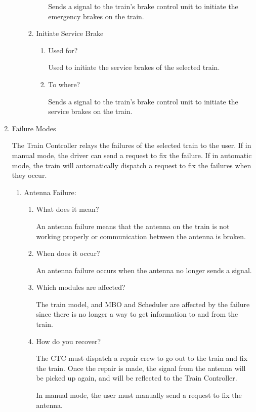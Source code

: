 \documentclass[11pt]{article}
\begin{document}
\begin{enumerate}
\begin{enumerate}
\begin{enumerate}
\begin{enumerate}
Sends a signal to the train's brake control unit to initiate the emergency brakes on the train.
\end{enumerate}
\item Initiate Service Brake
\label{sec-3-1-5-8-2-3}
\begin{enumerate}
\item Used for?
\label{sec-3-1-5-8-2-3-1}

Used to initiate the service brakes of the selected train.
\item To where?
\label{sec-3-1-5-8-2-3-2}

Sends a signal to the train's brake control unit to initiate the service brakes on the train.
\end{enumerate}
\end{enumerate}
\end{enumerate}
\item Failure Modes
\label{sec-3-1-5-9}

The Train Controller relays the failures of the selected train to the user. If in manual mode, the driver can send a request to fix the failure. If in automatic mode, the train will automatically dispatch a request to fix the failures when they occur. 
\begin{enumerate}
\item Antenna Failure:
\label{sec-3-1-5-9-1}
\begin{enumerate}
\item What does it mean?
\label{sec-3-1-5-9-1-1}

An antenna failure means that the antenna on the train is not working properly or communication between the antenna is broken.  
\item When does it occur?
\label{sec-3-1-5-9-1-2}

An antenna failure occurs when the antenna no longer sends a signal.
\item Which modules are affected?
\label{sec-3-1-5-9-1-3}

The train model, and MBO and Scheduler are affected by the failure since there is no longer a way to get information to and from the train. 
\item How do you recover?
\label{sec-3-1-5-9-1-4}

The CTC must dispatch a repair crew to go out to the train and fix the train.
Once the repair is made, the signal from the antenna will be picked up again, and will be reflected to the Train Controller.

In manual mode, the user must manually send a request to fix the antenna. 


\end{enumerate}
\end{enumerate}
\end{enumerate}
\end{document}
